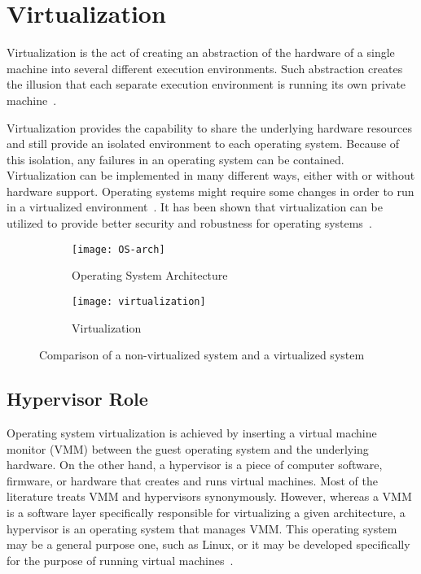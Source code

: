 \section{Virtualization}

Virtualization is the act of creating an abstraction of the hardware
of a single machine into several different execution environments. Such
abstraction creates the illusion that each separate execution environment
is running its own private machine~\cite{Galvin}.

Virtualization provides the capability to share the underlying hardware
resources and still provide an isolated environment to each operating
system. Because of this isolation, any failures in an operating
system can be contained. Virtualization can be implemented in many
different ways, either with or without hardware support. Operating
systems might require some changes in order to run in a virtualized
environment~\cite{Drepper:2008:CV:1348583.1348591}. It has been
shown that virtualization can be utilized to provide better security
and robustness for operating systems~\cite{Fraser04safehardware,
LeVasseur04UnmodifiedDriverReuse, Riley:2008:GPK:1433006.1433008}.

\begin{figure}[!ht]
    \centering
    \begin{subfigure}[b]{0.49\textwidth}
	\texttt{[image: OS-arch]}
	\caption{Operating System Architecture}
	\label{fig:OS}
    \end{subfigure}
	\hfill
    \begin{subfigure}[b]{0.49\textwidth}
	\texttt{[image: virtualization]}
	\caption{Virtualization}
	\label{fig:Virtualization}
	\end{subfigure}
    \caption{Comparison of a non-virtualized system and a virtualized system}\label{fig:Kernel space}
\end{figure}

\subsection{Hypervisor Role}
Operating system virtualization is achieved by inserting a virtual machine 
monitor (VMM) between the guest operating system and the underlying hardware. 
On the other hand, a hypervisor is a piece of computer software, firmware, or hardware
that creates and runs virtual machines.  Most of the literature treats VMM and
hypervisors synonymously. However, whereas a VMM is a software layer
specifically responsible for virtualizing a given architecture, a
hypervisor is an operating system that manages VMM. This operating
system may be a general purpose one, such as Linux, or it may
be developed specifically for the purpose of running virtual
machines~\cite{Agesen:2010:EXV:1899928.1899930}.

